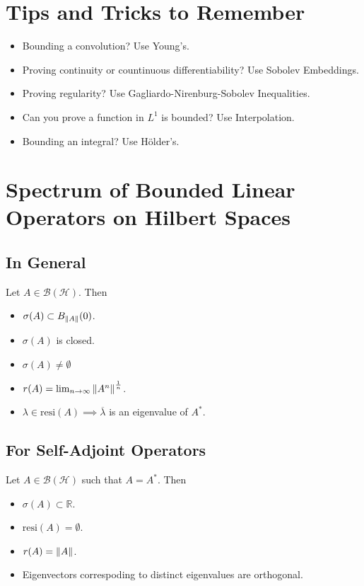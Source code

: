\documentclass{article}
\def\Rl{\mathbb{R}}
\def\hilb{\mathcal{H}}
\begin{document}
\section{Tips and Tricks to Remember}
    \begin{itemize}
        \item Bounding a convolution?  Use Young's.
        \item Proving continuity or countinuous differentiability?  Use Sobolev Embeddings.
        \item Proving regularity?  Use Gagliardo-Nirenburg-Sobolev Inequalities.
        \item Can you prove a function in $L^1$ is bounded?  Use Interpolation.
        \item Bounding an integral?  Use H\"{o}lder's.
    \end{itemize}

\pagebreak

\section{Spectrum of Bounded Linear Operators on Hilbert Spaces}
    \subsection{In General}
        Let $A \in \mathcal{B}(\hilb)$.  Then
        \begin{itemize}
            \item $\sigma(A) \subset B_{\norm{A}}(0)$.
            \item $\sigma(A)$ is closed.
            \item $\sigma(A) \neq \emptyset$
            \item $r(A) = \lim_{n\rightarrow\infty}\norm{A^n}^{\frac{1}{n}}$.
            \item $\lambda \in \text{resi}(A) \implies \overline{\lambda}$ is an eigenvalue of $A^*$.
        \end{itemize}
    \subsection{For Self-Adjoint Operators}
        Let $A \in \mathcal{B}(\hilb)$ such that $A = A^*$.  Then
        \begin{itemize}
            \item $\sigma(A) \subset \Rl$.
            \item $\text{resi}(A) = \emptyset$.
            \item $r(A) = \norm{A}$.
            \item Eigenvectors correspoding to distinct eigenvalues are orthogonal.
        \end{itemize}
\end{document}
